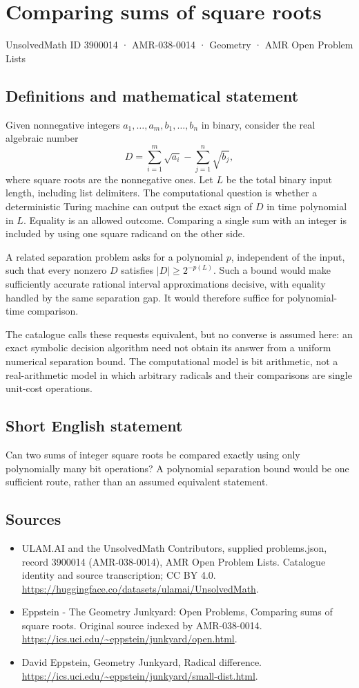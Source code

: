 \documentclass[11pt,a4paper]{article}
\begin{document}
\section*{Comparing sums of square roots}\label{3900014}
{\small UnsolvedMath ID 3900014 · AMR-038-0014 · Geometry · AMR Open Problem Lists}
\subsection{Definitions and mathematical statement}
Given nonnegative integers $a_1,\ldots,a_m,b_1,\ldots,b_n$ in binary,
consider the real algebraic number
\[
 D=\sum_{i=1}^m\sqrt{a_i}-\sum_{j=1}^n\sqrt{b_j},
\]
where square roots are the nonnegative ones. Let $L$ be the total binary
input length, including list delimiters. The computational question is
whether a deterministic Turing machine can output the exact sign of $D$
in time polynomial in $L$. Equality is an allowed outcome. Comparing a
single sum with an integer is included by using one square radicand on
the other side.

A related separation problem asks for a polynomial $p$, independent of
the input, such that every nonzero $D$ satisfies $|D|\ge2^{-p(L)}$.
Such a bound would make sufficiently accurate rational interval
approximations decisive, with equality handled by the same separation
gap. It would therefore suffice for polynomial-time comparison.

The catalogue calls these requests equivalent, but no converse is assumed
here: an exact symbolic decision algorithm need not obtain its answer
from a uniform numerical separation bound. The computational model is
bit arithmetic, not a real-arithmetic model in which arbitrary radicals
and their comparisons are single unit-cost operations.
\subsection{Short English statement}
Can two sums of integer square roots be compared exactly using only
polynomially many bit operations? A polynomial separation bound would be
one sufficient route, rather than an assumed equivalent statement.
\subsection{Sources}
\begin{itemize}
\item[S1] ULAM.AI and the UnsolvedMath Contributors, supplied problems.json, record 3900014 (AMR-038-0014), AMR Open Problem Lists. Catalogue identity and source transcription; CC BY 4.0.
\url{https://huggingface.co/datasets/ulamai/UnsolvedMath}.
\item[S2] Eppstein - The Geometry Junkyard: Open Problems, Comparing sums of square roots. Original source indexed by AMR-038-0014.
\url{https://ics.uci.edu/~eppstein/junkyard/open.html}.
\item[S3] David Eppstein, Geometry Junkyard, Radical difference.
\url{https://ics.uci.edu/~eppstein/junkyard/small-dist.html}.
\end{itemize}
\end{document}
